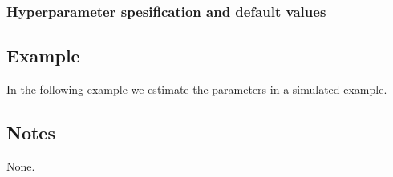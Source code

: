 \documentclass[a4paper,11pt]{article}
\begin{document}
\subsubsection*{Hyperparameter spesification and default values}



\subsection*{Example}

In the following example we estimate the parameters in a simulated
example.


\subsection*{Notes}

None.
\end{document}
